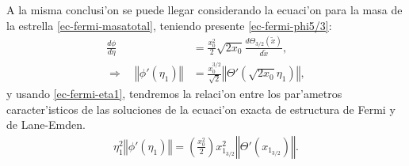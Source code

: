 A la misma conclusi'on se puede llegar considerando la ecuaci'on para la masa de la estrella \eqref{ec-fermi-masatotal}, teniendo presente \eqref{ec-fermi-phi5/3}:
\begin{align}
\frac{d\phi}{d\eta}&=\frac{x_0^2}{2}\sqrt{2x_0}\frac{d\Theta_{3/2}(\widetilde{x})}{d\widetilde{x}},\\
\Rightarrow\quad \left\Vert\phi'(\eta_1)\right\Vert&=\frac{x_0^{3/2}}{\sqrt{2}}\left\Vert\Theta'(\sqrt{2x_0}\eta_1)\right\Vert,
\end{align}
y usando \eqref{ec-fermi-eta1}, tendremos la relaci'on entre los par'ametros caracter'isticos de las soluciones de la ecuaci'on exacta de estructura de Fermi y de Lane-Emden.
\begin{align}
 \eta_1^2\left\Vert\phi'(\eta_1)\right\Vert=\left(\frac{x_0^2}{2}\right)x_{1_{3/2}}^2\left\Vert\Theta'(x_{1_{3/2}})\right\Vert.
\end{align}




